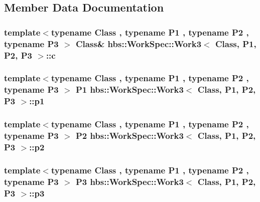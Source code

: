 \subsection{Member Data Documentation}
\hypertarget{structhbs_1_1_work_spec_1_1_work3_a1d5b33a2f2595b05d790f54409819c33}{
\subsubsection[{c}]{\setlength{\rightskip}{0pt plus 5cm}template$<$typename Class , typename P1 , typename P2 , typename P3 $>$ Class\& {\bf hbs\-::\-Work\-Spec\-::\-Work3}$<$ Class, P1, P2, P3 $>$\-::c}}\label{structhbs_1_1_work_spec_1_1_work3_a1d5b33a2f2595b05d790f54409819c33}
\hypertarget{structhbs_1_1_work_spec_1_1_work3_a0aaf6242c8e5e3a3db4a36b71eb160a2}{
\subsubsection[{p1}]{\setlength{\rightskip}{0pt plus 5cm}template$<$typename Class , typename P1 , typename P2 , typename P3 $>$ P1 {\bf hbs\-::\-Work\-Spec\-::\-Work3}$<$ Class, P1, P2, P3 $>$\-::p1}}\label{structhbs_1_1_work_spec_1_1_work3_a0aaf6242c8e5e3a3db4a36b71eb160a2}
\hypertarget{structhbs_1_1_work_spec_1_1_work3_a413cb2596ad3a67b8cce794e552e073b}{
\subsubsection[{p2}]{\setlength{\rightskip}{0pt plus 5cm}template$<$typename Class , typename P1 , typename P2 , typename P3 $>$ P2 {\bf hbs\-::\-Work\-Spec\-::\-Work3}$<$ Class, P1, P2, P3 $>$\-::p2}}\label{structhbs_1_1_work_spec_1_1_work3_a413cb2596ad3a67b8cce794e552e073b}
\hypertarget{structhbs_1_1_work_spec_1_1_work3_a45be68e8c2138f0af59cbb3da42b9ea3}{
\subsubsection[{p3}]{\setlength{\rightskip}{0pt plus 5cm}template$<$typename Class , typename P1 , typename P2 , typename P3 $>$ P3 {\bf hbs\-::\-Work\-Spec\-::\-Work3}$<$ Class, P1, P2, P3 $>$\-::p3}}\label{structhbs_1_1_work_spec_1_1_work3_a45be68e8c2138f0af59cbb3da42b9ea3}
